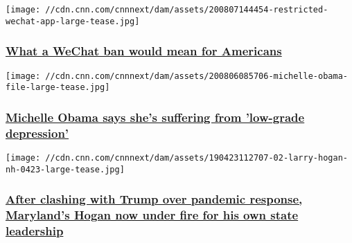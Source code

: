 \href{/2020/08/08/tech/wechat-chinese-americans-trump/index.html}{}

\texttt{[image: //cdn.cnn.com/cnnnext/dam/assets/200807144454-restricted-wechat-app-large-tease.jpg]}

\hypertarget{what-a-wechat-ban-would-mean-for-americans}{%
\subsubsection{\texorpdfstring{\href{/2020/08/08/tech/wechat-chinese-americans-trump/index.html}{What
a WeChat ban would mean for
Americans}}{What a WeChat ban would mean for Americans}}\label{what-a-wechat-ban-would-mean-for-americans}}

\href{/2020/08/06/us/michelle-obama-coronavirus-depression-trnd/index.html}{}

\texttt{[image: //cdn.cnn.com/cnnnext/dam/assets/200806085706-michelle-obama-file-large-tease.jpg]}

\hypertarget{michelle-obama-says-shes-suffering-from-low-grade-depression}{%
\subsubsection{\texorpdfstring{\href{/2020/08/06/us/michelle-obama-coronavirus-depression-trnd/index.html}{Michelle
Obama says she's suffering from 'low-grade
depression'}}{Michelle Obama says she's suffering from 'low-grade depression'}}\label{michelle-obama-says-shes-suffering-from-low-grade-depression}}

\href{/2020/08/08/politics/larry-hogan-coronavirus-schools-voting-elections/index.html}{}

\texttt{[image: //cdn.cnn.com/cnnnext/dam/assets/190423112707-02-larry-hogan-nh-0423-large-tease.jpg]}

\hypertarget{after-clashing-with-trump-over-pandemic-response-marylands-hogan-now-under-fire-for-his-own-state-leadership-}{%
\subsubsection{\texorpdfstring{\href{/2020/08/08/politics/larry-hogan-coronavirus-schools-voting-elections/index.html}{After
clashing with Trump over pandemic response, Maryland's Hogan now under
fire for his own state leadership
}}{After clashing with Trump over pandemic response, Maryland's Hogan now under fire for his own state leadership }}\label{after-clashing-with-trump-over-pandemic-response-marylands-hogan-now-under-fire-for-his-own-state-leadership-}}

